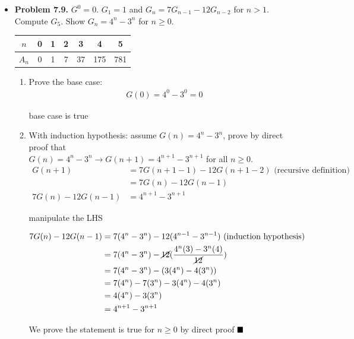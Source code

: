\documentclass{article}
\begin{document}
    \begin{itemize}
        \item \textbf{Problem 7.9.} $G^0 = 0$. $G_1 = 1$ and $G_n = 7G_{n-1} - 12 G_{n-2}$ for $n > 1$. Compute $G_5$. Show $G_n = 4^n - 3^n$ for $n \geq 0$.\\
        \begin{tabular}{ |c|c|c|c|c|c|c| } 
            \hline
            $n$ & 0 & 1 & 2 & 3 & 4 & 5\\ 
            \hline
            $A_n$ & 0 & 1 & 7 & 37 & 175 & 781 \\
            \hline
        \end{tabular}
        \begin{enumerate}[label=(\roman*)]
            \item Prove the base case:
            \begin{align*}
                G(0) = 4^0 - 3^0 = 0
            \end{align*}
            \begin{center}
                base case is true\\
            \end{center}
            \item With induction hypothesis: assume $G(n) = 4^n - 3^n$, prove by direct proof that\\ $G(n) = 4^n - 3^n \rightarrow G(n+1) = 4^{n+1} - 3^{n+1}$ for all $n \geq 0$.
            \begin{align*}
                G(n + 1) &= 7G(n+1-1) - 12G(n+1-2) \text{ (recursive definition)}\\ 
                &= 7G(n) - 12G(n-1)\\
                7G(n) - 12G(n-1) &= 4^{n+1} - 3^{n+1}
            \end{align*}
            \begin{center}
                manipulate the LHS
            \end{center}
            \begin{align*}
                7G(n) - 12G(n-1) &= 7(4^{n} - 3^{n})  - 12(4^{n-1} - 3^{n-1})\text{ (induction hypothesis)}\\
                &= 7(4^n - 3^n) - \cancel{12}(\frac{4^n(3) - 3^n(4)}{\cancel{12}})\\
                &= 7(4^n - 3^n) - (3(4^n) - 4(3^n))\\
                &= 7(4^n) - 7(3^n) - 3(4^n) - 4(3^n)\\
                &= 4(4^n) - 3(3^n)\\
                &= 4^{n+1} - 3^{n+1}
            \end{align*}
            \begin{center}
                We prove the statement is true for $n \geq 0$ by direct proof $\hfill\blacksquare$
            \end{center}


\end{enumerate}
\end{itemize}
\end{document}
